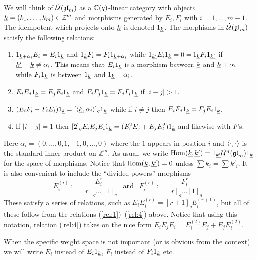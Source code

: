 \documentclass[10pt,leqno]{article}
\begin{document}
We will think of $\dot{{\mathcal{U}}}({\mathfrak{gl}}_m)$ as a ${\mathbb{C}}(q)$-linear category with objects $ {\underline{k}} = (k_1, \dots, k_m) \in \mathbb Z^m $ and morphisms generated by $ E_i, F_i$ with $i=1, \dots, m-1$. The idempotent which projects onto ${\underline{k}}$ is denoted $1_{\underline{k}}$. The morphisms in $\dot{{\mathcal{U}}}({\mathfrak{gl}}_m)$ satisfy the following relations:
\begin{enumerate}
\item\label{rel:1} $1_{{\underline{k}}+\alpha_i} E_i = E_i 1_{{\underline{k}}}$ and $1_{{\underline{k}}} F_i = F_i 1_{{\underline{k}}+\alpha_i}$ while $1_{{\underline{k'}}} E_i 1_{{\underline{k}}} = 0 = 1_{{\underline{k}}} F_i 1_{{\underline{k'}}}$ if ${\underline{k'}}-{\underline{k}} \ne \alpha_i$. This means that $E_i 1_{{\underline{k}}}$ is a morphism between ${\underline{k}}$ and ${\underline{k}} + \alpha_i$ while $F_i 1_{{\underline{k}}}$ is between $1_{{\underline{k}}}$ and $1_{{\underline{k}}} - \alpha_i$. 
\item\label{rel:2} $E_iE_j 1_{{\underline{k}}} = E_jE_i 1_{{\underline{k}}}$ and $F_iF_j 1_{{\underline{k}}} = F_jF_i 1_{{\underline{k}}}$ if $|i-j|>1$. 
\item\label{rel:3} $(E_iF_i - F_iE_i) 1_{{\underline{k}}} = [\langle {\underline{k}}, \alpha_i \rangle]_q 1_{{\underline{k}}}$ while if $i \ne j$ then $E_iF_j 1_{{\underline{k}}} = F_jE_i 1_{{\underline{k}}}$. 
\item\label{rel:4} If $|i-j|=1$ then $[2]_q E_iE_jE_i 1_{{\underline{k}}} = (E_i^2 E_j + E_j E_i^2) 1_{{\underline{k}}}$ and likewise with $F$'s. 
\end{enumerate}
Here $\alpha_i = (0,\dots,0,1,-1,0,\dots,0)$ where the $1$ appears in position $i$ and $\langle \cdot, \cdot \rangle$ is the standard inner product on $\mathbb Z^m$. As usual, we write $\operatorname{Hom}({\underline{k}}, {\underline{k'}}) = 1_{\underline{k'}} \dot{{\mathcal{U}}}^n({\mathfrak{gl}}_m) 1_{\underline{k}}$ for the space of morphisms. Notice that $\operatorname{Hom}({\underline{k}}, {\underline{k'}}) = 0 $ unless $\sum k_i = \sum k'_i$. It is also convenient to include the ``divided powers'' morphisms 
$$E_i^{(r)} := \frac{E_i^r}{[r]_q \dots [1]_q} \ \ \text{ and } \ \ F_i^{(r)} := \frac{F_i^r}{[r]_q \dots [1]_q}.$$
These satisfy a series of relations, such as $E_i E_i^{(r)} = [r+1]_q E_i^{(r+1)}$, but all of these follow from the relations (\ref{rel:1})--(\ref{rel:4}) above. Notice that using this notation, relation (\ref{rel:4}) takes on the nice form $E_iE_jE_i = E_i^{(2)}E_j + E_jE_i^{(2)}$. 

\begin{rem} When the specific weight space is not important (or is obvious from the context) we will write $E_i$ instead of $E_i 1_{{\underline{k}}}$, $F_i$ instead of $F_i 1_{{\underline{k}}}$ etc. 
\end{rem}
\end{document}
